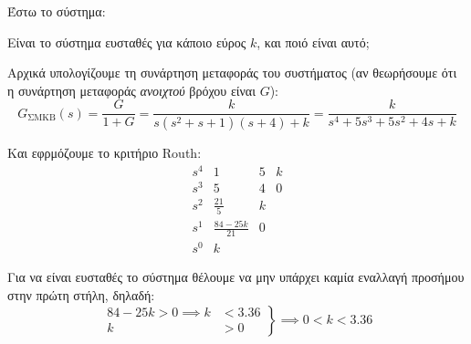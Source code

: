 \documentclass[11pt,a4paper,notitlepage,fleqn,final]{article}
\begin{document}
\begin{exercise}
Έστω το σύστημα:


Είναι το σύστημα ευσταθές για κάποιο εύρος \( k \), και ποιό είναι αυτό;

\tcblower
Αρχικά υπολογίζουμε τη συνάρτηση μεταφοράς του συστήματος (αν θεωρήσουμε ότι η συνάρτηση μεταφοράς \textit{ανοιχτού} βρόχου είναι
\(G\)):
\[
G_{\text{ΣΜΚΒ}}(s) = \frac{G}{1+G} = \frac{k}{s(s^2+s+1)(s+4)+k} = \frac{k}{s^4+5s^3+5s^2+4s+k}
\]

Και εφρμόζουμε το κριτήριο Routh:
\[
\begin{array}{r|ccc}
s^4&1&5&k\\
s^3&5&4&0\\
s^2&\frac{21}{5}& k\\
s^1&\frac{84-25k}{21} & 0\\
s^0&k
\end{array}
\]

Για να είναι ευσταθές το σύστημα θέλουμε να μην υπάρχει καμία εναλλαγή προσήμου στην πρώτη στήλη, δηλαδή:
\[
\left.
\begin{aligned}
84-25k > 0 \implies k &< 3.36 \\
k&>0
\end{aligned}
\right\rbrace \implies 0 < k < 3.36
\]

\end{exercise}
\end{document}
